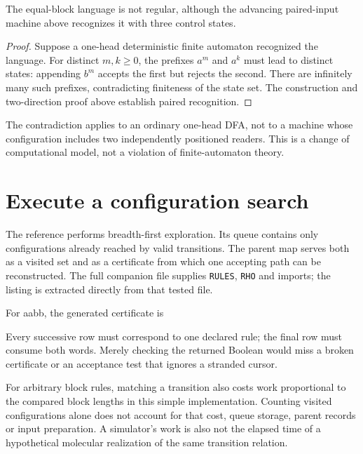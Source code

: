 \begin{proposition}
The equal-block language is not regular, although the advancing paired-input
machine above recognizes it with three control states.
\end{proposition}
\begin{proof}
Suppose a one-head deterministic finite automaton recognized the language.
For distinct $m,k\geq0$, the prefixes $a^m$ and $a^k$ must lead to distinct
states: appending $b^m$ accepts the first but rejects the second. There are
infinitely many such prefixes, contradicting finiteness of the state set.
The construction and two-direction proof above establish paired recognition.
\end{proof}
The contradiction applies to an ordinary one-head DFA, not to a machine
whose configuration includes two independently positioned readers. This is
a change of computational model, not a violation of finite-automaton theory.



\section{Execute a configuration search}
The reference performs breadth-first exploration. Its queue contains only
configurations already reached by valid transitions. The parent map serves
both as a visited set and as a certificate from which one accepting path can
be reconstructed. The full companion file supplies \texttt{RULES}, \texttt{RHO}
and imports; the listing is extracted directly from that tested file.

For aabb, the generated certificate is
\begin{center}\end{center}
Every successive row must correspond to one declared rule; the final row must
consume both words. Merely checking the returned Boolean would miss a broken
certificate or an acceptance test that ignores a stranded cursor.

For arbitrary block rules, matching a transition also costs work proportional
to the compared block lengths in this simple implementation. Counting visited
configurations alone does not account for that cost, queue storage, parent
records or input preparation. A simulator's work is also not the elapsed time
of a hypothetical molecular realization of the same transition relation.

